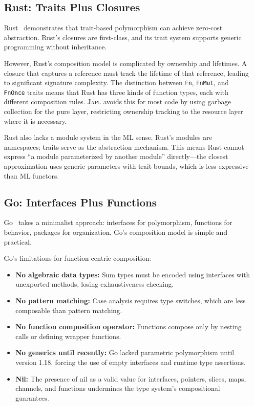 \documentclass[11pt,a4paper]{article}
\newcommand{\japl}{\textsc{Japl}}
\begin{document}
\subsection{Rust: Traits Plus Closures}

Rust~\citep{matsakis2014rust} demonstrates that trait-based polymorphism can achieve zero-cost abstraction. Rust's closures are first-class, and its trait system supports generic programming without inheritance.

However, Rust's composition model is complicated by ownership and lifetimes. A closure that captures a reference must track the lifetime of that reference, leading to significant signature complexity. The distinction between \texttt{Fn}, \texttt{FnMut}, and \texttt{FnOnce} traits means that Rust has three kinds of function types, each with different composition rules. \japl{} avoids this for most code by using garbage collection for the pure layer, restricting ownership tracking to the resource layer where it is necessary.

Rust also lacks a module system in the ML sense. Rust's modules are namespaces; traits serve as the abstraction mechanism. This means Rust cannot express ``a module parameterized by another module'' directly---the closest approximation uses generic parameters with trait bounds, which is less expressive than ML functors.

\subsection{Go: Interfaces Plus Functions}

Go~\citep{pike2012go} takes a minimalist approach: interfaces for polymorphism, functions for behavior, packages for organization. Go's composition model is simple and practical.

Go's limitations for function-centric composition:
\begin{itemize}
  \item \textbf{No algebraic data types:} Sum types must be encoded using interfaces with unexported methods, losing exhaustiveness checking.
  \item \textbf{No pattern matching:} Case analysis requires type switches, which are less composable than pattern matching.
  \item \textbf{No function composition operator:} Functions compose only by nesting calls or defining wrapper functions.
  \item \textbf{No generics until recently:} Go lacked parametric polymorphism until version 1.18, forcing the use of empty interfaces and runtime type assertions.
  \item \textbf{Nil:} The presence of nil as a valid value for interfaces, pointers, slices, maps, channels, and functions undermines the type system's compositional guarantees.
\end{itemize}
\end{document}
